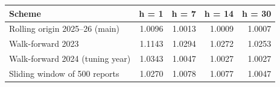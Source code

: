 \begin{tabular}{lrrrr}
\toprule
\textbf{Scheme} & \textbf{h = 1} & \textbf{h = 7} & \textbf{h = 14} & \textbf{h = 30} \\
\midrule
Rolling origin 2025--26 (main) & 1.0096 & 1.0013 & 1.0009 & 1.0007 \\
Walk-forward 2023 & 1.1143 & 1.0294 & 1.0272 & 1.0253 \\
Walk-forward 2024 (tuning year) & 1.0343 & 1.0047 & 1.0027 & 1.0027 \\
Sliding window of 500 reports & 1.0270 & 1.0078 & 1.0077 & 1.0047 \\
\bottomrule
\end{tabular}
